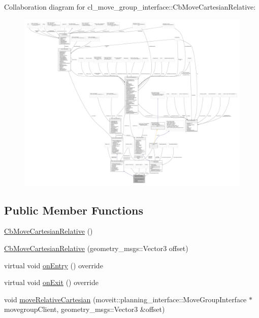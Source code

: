Collaboration diagram for cl\+\_\+move\+\_\+group\+\_\+interface\+:\+:Cb\+Move\+Cartesian\+Relative\+:
\nopagebreak
\begin{figure}[H]
\begin{center}
\leavevmode
\includegraphics[width=350pt]{classcl__move__group__interface_1_1CbMoveCartesianRelative__coll__graph}
\end{center}
\end{figure}
\subsection*{Public Member Functions}
\begin{DoxyCompactItemize}
\item 
\hyperlink{classcl__move__group__interface_1_1CbMoveCartesianRelative_a1e9c37f096a7f7cb2973cf739c967f36}{Cb\+Move\+Cartesian\+Relative} ()
\item 
\hyperlink{classcl__move__group__interface_1_1CbMoveCartesianRelative_a725ebdd1fdbc3c7a356e9c94cbc14259}{Cb\+Move\+Cartesian\+Relative} (geometry\+\_\+msgs\+::\+Vector3 offset)
\item 
virtual void \hyperlink{classcl__move__group__interface_1_1CbMoveCartesianRelative_a7d65e3d5fa3f2c7b47d9cbe631f448ad}{on\+Entry} () override
\item 
virtual void \hyperlink{classcl__move__group__interface_1_1CbMoveCartesianRelative_a4ec79f1b62ddd8ecabf1f63aabb69013}{on\+Exit} () override
\item 
void \hyperlink{classcl__move__group__interface_1_1CbMoveCartesianRelative_ae8443c7f81affe5c4450e83fc665487f}{move\+Relative\+Cartesian} (moveit\+::planning\+\_\+interface\+::\+Move\+Group\+Interface $\ast$movegroup\+Client, geometry\+\_\+msgs\+::\+Vector3 \&offset)
\end{DoxyCompactItemize}
